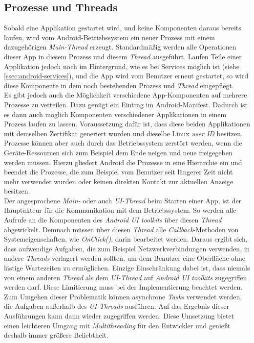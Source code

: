 \subsection{Prozesse und Threads}
\label{ssec:android-prozesse-threads}
Sobald eine Applikation gestartet wird, und keine Komponenten daraus bereits laufen, wird vom Android-Betriebssystem ein neuer Prozess mit einem dazugehörigen \textit{Main-Thread} erzeugt. Standardmäßig werden alle Operationen dieser App in diesem Prozess und diesem \textit{Thread} ausgeführt. Laufen Teile einer Applikation jedoch noch im Hintergrund, wie es bei Services möglich ist (siehe \ref{ssec:android-services}), und die App wird vom Benutzer erneut gestartet, so wird diese Komponente in dem noch bestehenden Prozess und \textit{Thread} eingepflegt.\\
Es gibt jedoch auch die Möglichkeit verschiedene App-Komponenten auf mehrere Prozesse zu verteilen. Dazu genügt ein Eintrag im Android-Manifest. Dadurch ist es dann auch möglich Komponenten verschiedener Applikationen in einem Prozess laufen zu lassen. Voraussetzung dafür ist, dass diese beiden Applikationen mit demselben Zertifikat generiert wurden und dieselbe Linux \textit{\ac{user ID}} besitzen.\\
Prozesse können aber auch durch das Betriebssystem zerstört werden, wenn die Geräte-Ressourcen sich zum Beispiel dem Ende neigen und neue freigegeben werden müssen. Hierzu gliedert Android die Prozesse in eine Hierarchie ein und beendet die Prozesse, die zum Beispiel vom Benutzer seit längerer Zeit nicht mehr verwendet wurden oder keinen direkten Kontakt zur aktuellen Anzeige besitzen.\\
Der angesprochene \textit{Main-} oder auch \textit{\ac{UI-Thread}} beim Starten einer App, ist der Hauptakteur für die Kommunikation mit dem Betriebssystem. So werden alle Aufrufe an die Komponenten des \textit{Android UI toolkits} über diesen \textit{Thread} abgewickelt. Demnach müssen über diesen \textit{Thread} alle \textit{Callback}-Methoden von Systemeigenschaften, wie \textit{OnClick()}, darin bearbeitet werden. Daraus ergibt sich, dass aufwendige Aufgaben, die zum Beispiel Netzwerkverbindungen verwenden, in andere \textit{Threads} verlagert werden sollten, um dem Benutzer eine Oberfläche ohne lästige Wartezeiten zu ermöglichen. Einzige Einschränkung dabei ist, dass niemals von einem anderen \textit{Thread} als dem \textit{UI-Thread} auf \textit{\ac{Android UI toolkits}} zugegriffen werden darf. Diese Limitierung muss bei der Implementierung beachtet werden.\\
Zum Umgehen dieser Problematik können asynchrone \textit{\ac{Tasks}} verwendet werden, die Aufgaben außerhalb des \textit{UI-Threads} ausführen. Auf das Ergebnis dieser Ausführungen kann dann wieder zugegriffen werden. Diese Umsetzung bietet einen leichteren Umgang mit \textit{Multithreading} für den Entwickler und genießt deshalb immer größere Beliebtheit.
